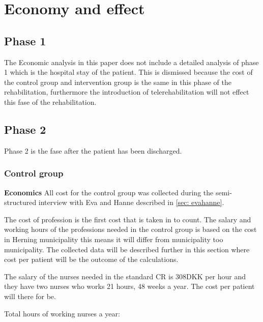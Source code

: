 \section{Economy and effect}




\subsection{Phase 1}

The Economic analysis in this paper does not include a detailed analysis of phase 1 which is the hospital stay of the patient. This is dismissed because the cost of the control group and intervention group is the same in this phase of the rehabilitation, furthermore the introduction of telerehabilitation will not effect this fase of the rehabilitation. 


\subsection{Phase 2}

Phase 2 is the fase after the patient has been discharged. 



\subsubsection{Control group}

\textbf{Economics}
All cost for the control group was collected during the semi-structured interview with Eva and Hanne described in \cref{sec: evahanne}. 

The cost of profession is the first cost that is taken in to count.
The salary and working hours of the professions needed in the control group is based on the cost in Herning municipality this means it will differ from municipality too municipality. The collected data will be described further in this section where cost per patient will be the outcome of the calculations. 


The salary of the nurses needed in the standard CR is 308DKK per hour and they have two nurses who works 21 hours, 48 weeks a year. The cost per patient will there for be.

Total hours of working nurses a year:

